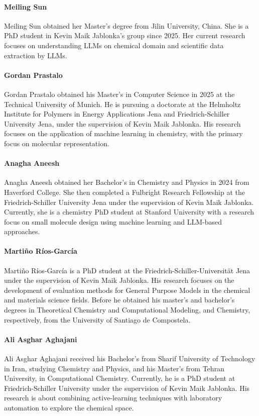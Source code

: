 \paragraph{Meiling Sun}
Meiling Sun obtained her Master's degree from Jilin University, China. She is a PhD student in Kevin Maik Jablonka's group since 2025. Her current research focuses on understanding LLMs on chemical domain and scientific data extraction by LLMs.

\paragraph{Gordan Prastalo}
Gordan Prastalo obtained his Master's in Computer Science in 2025 at the Technical University of Munich. He is pursuing a doctorate at the Helmholtz Institute for Polymers in Energy Applications Jena and Friedrich-Schiller University Jena, under the supervision of Kevin Maik Jablonka. His research focuses on the application of machine learning in chemistry, with the primary focus on molecular representation.

\paragraph{Anagha Aneesh}
Anagha Aneesh obtained her Bachelor's in Chemistry and Physics in 2024 from Haverford College. She then completed a Fulbright Research Fellowship at the Friedrich-Schiller University Jena under the supervision of Kevin Maik Jablonka. Currently, she is a chemistry PhD student at Stanford University with a research focus on small molecule design using machine learning and LLM-based approaches.

\paragraph{Martiño Ríos-García}
Martiño Ríos-García is a PhD student at the Friedrich-Schiller-Universität Jena under the supervision of Kevin Maik Jablonka. His research focuses on the development of evaluation methods for General Purpose Models in the chemical and materials science fields. Before he obtained his master's and bachelor's degrees in Theoretical Chemistry and Computational Modeling, and Chemistry, respectively, from the University of Santiago de Compostela.

\paragraph{Ali Asghar Aghajani}
Ali Asghar Aghajani received his Bachelor's from Sharif University of Technology in Iran, studying Chemistry and Physics, and his Master's from Tehran University, in Computational Chemistry. Currently, he is a PhD student at Friedrich-Schiller University under the supervision of Kevin Maik Jablonka. His research is about combining active-learning techniques with laboratory automation to explore the chemical space.